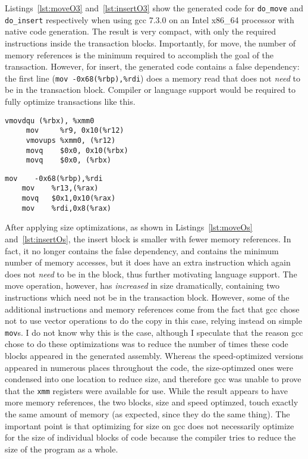 Listings~\ref{lst:moveO3} and~\ref{lst:insertO3} show the generated code for
\texttt{do\_move} and \texttt{do\_insert} respectively when using gcc 7.3.0 on
an Intel x86\_64 processor with native code generation. The result is very
compact, with only the required instructions inside the transaction blocks.
Importantly, for move, the number of memory references is the minimum required to
accomplish the goal of the transaction. However, for insert, the generated code
contains a false dependency: the first line (\texttt{mov -0x68(\%rbp),\%rdi})
does a memory read that does not \textit{need} to be in the transaction block.
Compiler or language support would be required to fully optimize transactions
like this.


\begin{lstlisting}[caption={Transaction code, do\_move, optimized for speed.
Five instructions, five memory accesses (four writes).},label={lst:moveO3}]
     vmovdqu (%rbx), %xmm0
     mov     %r9, 0x10(%r12)
     vmovups %xmm0, (%r12)
     movq    $0x0, 0x10(%rbx)
     movq    $0x0, (%rbx)
\end{lstlisting}

\begin{lstlisting}[caption={Transaction code, do\_insert, optimized for speed.
Four instructions, four memory accesses (three writes).},label=lst:insertO3]
    mov    -0x68(%rbp),%rdi
    mov    %r13,(%rax)
    movq   $0x1,0x10(%rax)
    mov    %rdi,0x8(%rax)
\end{lstlisting}


After applying size optimizations, as shown in Listings~\ref{lst:moveOs}
and~\ref{lst:insertOs}, the insert block is smaller with fewer memory
references. In fact, it no longer contains the false dependency, and contains
the minimum number of memory accesses, but it does have
an extra instruction which again does not \textit{need} to be in the block, thus
further motivating language support. The move operation, however, has
\textit{increased} in size dramatically, containing two instructions which need
not be in the transaction block. However, some of the additional instructions
and memory references come from the fact that gcc chose not to use vector
operations to do the copy in this case, relying instead on simple \texttt{mov}s.
I do not know why this is the case, although I speculate that the reason gcc
chose to do these optimizations was to reduce the number of times these code
blocks appeared in the generated assembly. Whereas the speed-optimized versions
appeared in numerous places throughout the code, the size-optimzed ones were
condensed into one location to reduce size, and therefore gcc was unable to
prove that the \texttt{xmm} registers were available for use. While the result
appears to have more memory references, the two blocks, size and speed optimzed,
touch exactly the same amount of memory (as expected, since they do the same thing).
The important point is that optimizing for size on gcc does not necessarily
optimize for the size of individual blocks of code because the compiler tries to
reduce the size of the program as a whole.




